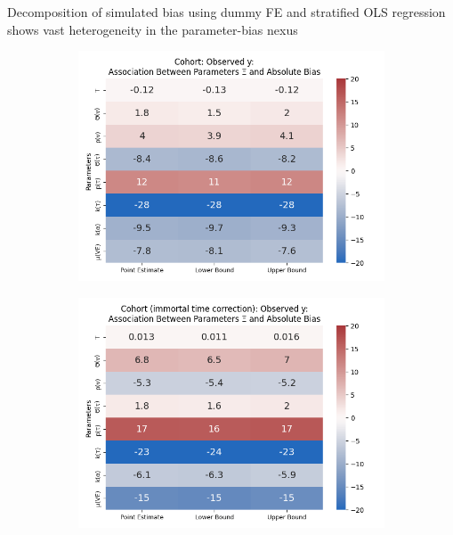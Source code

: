 \documentclass[aspectratio=169]{beamer}
\begin{document}
\begin{frame}{Decomposition of simulated bias using dummy FE and stratified OLS regression shows vast heterogeneity in the parameter-bias nexus}
	\begin{figure}[H]
		\centering
		\begin{subfigure}[t]{0.23\linewidth}
			\centering
			\includegraphics[scale=0.25]{VEMethod_Drivers1b_FEest_Li_MSpec_Heatmap5.png}
		\end{subfigure}
		\begin{subfigure}[t]{0.23\linewidth}
			\centering
			\includegraphics[scale=0.25]{VEMethod_Drivers1b_FEest_Li_MSpec_Heatmap6.png}
		\end{subfigure}
		\begin{subfigure}[t]{0.23\linewidth}

\end{subfigure}
\end{figure}
\end{frame}
\end{document}
